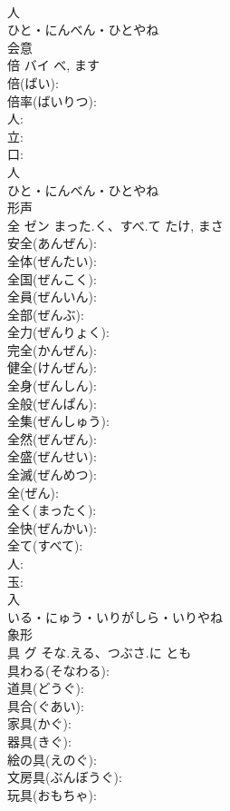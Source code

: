 \documentclass[8pt]{extreport}
\begin{document}
\begin{CJK}{UTF8}{min}
\\	人	
\\	ひと・にんべん・ひとやね	
\\	会意 
\\	倍	バイ		べ, ます	
\\	倍(ばい): 
\\	倍率(ばいりつ): 
\\	人: 
\\	立: 
\\	口: 
\\	人	
\\	ひと・にんべん・ひとやね	
\\	形声 
\\	全	ゼン	まった.く、すべ.て	たけ, まさ	
\\	安全(あんぜん): 
\\	全体(ぜんたい): 
\\	全国(ぜんこく): 
\\	全員(ぜんいん): 
\\	全部(ぜんぶ): 
\\	全力(ぜんりょく): 
\\	完全(かんぜん): 
\\	健全(けんぜん): 
\\	全身(ぜんしん): 
\\	全般(ぜんぱん): 
\\	全集(ぜんしゅう): 
\\	全然(ぜんぜん): 
\\	全盛(ぜんせい): 
\\	全滅(ぜんめつ): 
\\	全(ぜん): 
\\	全く(まったく): 
\\	全快(ぜんかい): 
\\	全て(すべて): 
\\	人: 
\\	玉: 
\\	入	
\\	いる・にゅう・いりがしら・いりやね	
\\	象形 
\\	具	グ	そな.える、つぶさ.に	とも	
\\	具わる(そなわる): 
\\	道具(どうぐ): 
\\	具合(ぐあい): 
\\	家具(かぐ): 
\\	器具(きぐ): 
\\	絵の具(えのぐ): 
\\	文房具(ぶんぼうぐ): 
\\	玩具(おもちゃ): 

\end{CJK}
\end{document}
